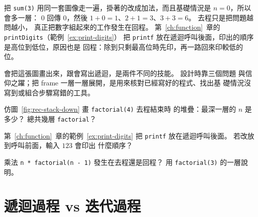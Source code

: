 \begin{center}
\label{fig:rec-stack-up}
\end{center}

把 \texttt{sum(3)} 用同一套圖像走一遍，掛著的改成加法，而且基礎情況是
$n = 0$，所以會多一層：
$0$ 回傳 $0$，然後 $1+0=1$、$2+1=3$、$3+3=6$。 去程只是把問題越問越小，
真正把數字組起來的工作發生在回程。 第~\ref{ch:function}~章的
\texttt{printDigits}（範例~\ref{ex:print-digits}）
把 \texttt{printf} 放在遞迴呼叫後面，印出的順序是高位到低位，原因也是
回程：除到只剩最高位時先印，再一路回來印較低的位。

會把這張圖畫出來，跟會寫出遞迴，是兩件不同的技能。 設計時靠三個問題
與信仰之躍；把 frame 一層一層展開，是用來核對已經寫好的程式、找出基
礎情況沒寫到或組合步驟寫錯的工具。


\begin{drills}[label=drills:rec-stack]
\item 仿圖~\ref{fig:rec-stack-down} 畫 \texttt{factorial(4)} 去程結束時
的堆疊：最深一層的 $n$ 是多少？ 總共幾層 \texttt{factorial}？
\item 第~\ref{ch:function}~章的範例~\ref{ex:print-digits} 把
\texttt{printf} 放在遞迴呼叫後面。 若改放到呼叫前面，輸入 $123$ 會印出
什麼順序？
\item 乘法 \texttt{n * factorial(n - 1)} 發生在去程還是回程？ 用
\texttt{factorial(3)} 的一層說明。
\end{drills}

\section{遞迴過程 vs 迭代過程}
\label{sec:rec-process}

